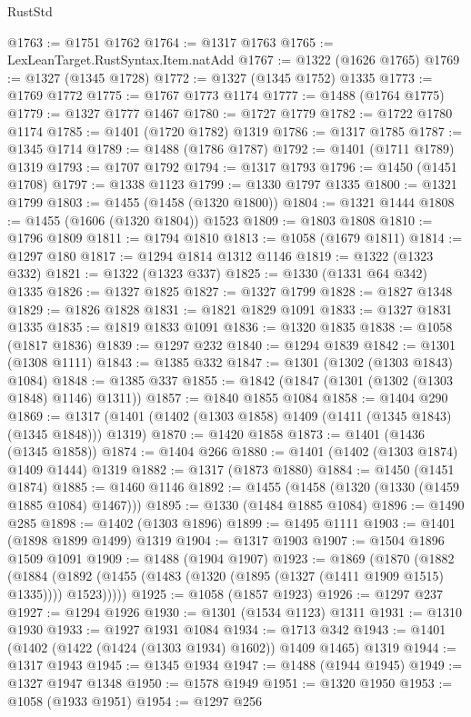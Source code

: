 \begin{lexlean}{RustStd}
\begin{coremodule}
@1763 := @1751 @1762
@1764 := @1317 @1763
@1765 := LexLeanTarget.RustSyntax.Item.natAdd
@1767 := @1322 (@1626 @1765)
@1769 := @1327 (@1345 @1728)
@1772 := @1327 (@1345 @1752) @1335
@1773 := @1769 @1772
@1775 := @1767 @1773 @1174
@1777 := @1488 (@1764 @1775)
@1779 := @1327 @1777 @1467
@1780 := @1727 @1779
@1782 := @1722 @1780 @1174
@1785 := @1401 (@1720 @1782) @1319
@1786 := @1317 @1785
@1787 := @1345 @1714
@1789 := @1488 (@1786 @1787)
@1792 := @1401 (@1711 @1789) @1319
@1793 := @1707 @1792
@1794 := @1317 @1793
@1796 := @1450 (@1451 @1708)
@1797 := @1338 @1123
@1799 := @1330 @1797 @1335
@1800 := @1321 @1799
@1803 := @1455 (@1458 (@1320 @1800))
@1804 := @1321 @1444
@1808 := @1455 (@1606 (@1320 @1804)) @1523
@1809 := @1803 @1808
@1810 := @1796 @1809
@1811 := @1794 @1810
@1813 := @1058 (@1679 @1811)
@1814 := @1297 @180
@1817 := @1294 @1814 @1312 @1146
@1819 := @1322 (@1323 @332)
@1821 := @1322 (@1323 @337)
@1825 := @1330 (@1331 @64 @342) @1335
@1826 := @1327 @1825
@1827 := @1327 @1799
@1828 := @1827 @1348
@1829 := @1826 @1828
@1831 := @1821 @1829 @1091
@1833 := @1327 @1831 @1335
@1835 := @1819 @1833 @1091
@1836 := @1320 @1835
@1838 := @1058 (@1817 @1836)
@1839 := @1297 @232
@1840 := @1294 @1839
@1842 := @1301 (@1308 @1111)
@1843 := @1385 @332
@1847 := @1301 (@1302 (@1303 @1843) @1084)
@1848 := @1385 @337
@1855 := @1842 (@1847 (@1301 (@1302 (@1303 @1848) @1146) @1311))
@1857 := @1840 @1855 @1084
@1858 := @1404 @290
@1869 := @1317 (@1401 (@1402 (@1303 @1858) @1409 (@1411 (@1345 @1843) (@1345 @1848))) @1319)
@1870 := @1420 @1858
@1873 := @1401 (@1436 (@1345 @1858))
@1874 := @1404 @266
@1880 := @1401 (@1402 (@1303 @1874) @1409 @1444) @1319
@1882 := @1317 (@1873 @1880)
@1884 := @1450 (@1451 @1874)
@1885 := @1460 @1146
@1892 := @1455 (@1458 (@1320 (@1330 (@1459 @1885 @1084) @1467)))
@1895 := @1330 (@1484 @1885 @1084)
@1896 := @1490 @285
@1898 := @1402 (@1303 @1896)
@1899 := @1495 @1111
@1903 := @1401 (@1898 @1899 @1499) @1319
@1904 := @1317 @1903
@1907 := @1504 @1896 @1509 @1091
@1909 := @1488 (@1904 @1907)
@1923 := @1869
    (@1870
      (@1882
        (@1884 (@1892 (@1455 (@1483 (@1320 (@1895 (@1327 (@1411 @1909 @1515) @1335)))) @1523)))))
@1925 := @1058 (@1857 @1923)
@1926 := @1297 @237
@1927 := @1294 @1926
@1930 := @1301 (@1534 @1123) @1311
@1931 := @1310 @1930
@1933 := @1927 @1931 @1084
@1934 := @1713 @342
@1943 := @1401 (@1402 (@1422 (@1424 (@1303 @1934) @1602)) @1409 @1465) @1319
@1944 := @1317 @1943
@1945 := @1345 @1934
@1947 := @1488 (@1944 @1945)
@1949 := @1327 @1947 @1348
@1950 := @1578 @1949
@1951 := @1320 @1950
@1953 := @1058 (@1933 @1951)
@1954 := @1297 @256

\end{coremodule}
\end{lexlean}
